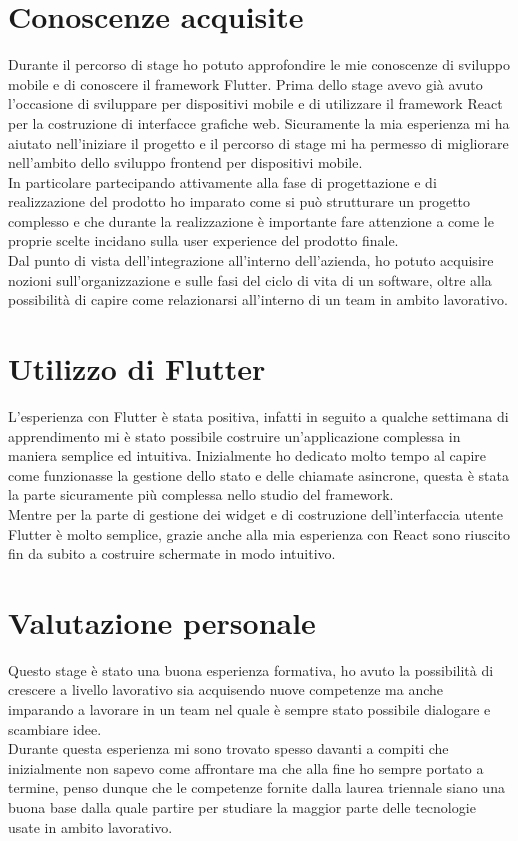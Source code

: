 \section{Conoscenze acquisite}
Durante il percorso di stage ho potuto approfondire le mie conoscenze di sviluppo mobile e di conoscere il framework Flutter.
Prima dello stage avevo già avuto l'occasione di sviluppare per dispositivi mobile e di utilizzare il framework React per la costruzione di interfacce grafiche web. Sicuramente la mia esperienza mi ha aiutato nell'iniziare il progetto e il percorso di stage mi ha permesso di migliorare nell'ambito dello sviluppo frontend per dispositivi mobile.\\
In particolare partecipando attivamente alla fase di progettazione e di realizzazione del prodotto ho imparato come si può strutturare un progetto complesso e che durante la realizzazione è importante fare attenzione a come le proprie scelte incidano sulla user experience del prodotto finale.\\
Dal punto di vista dell’integrazione all’interno dell’azienda, ho potuto acquisire nozioni sull’organizzazione e sulle fasi del ciclo di vita di un software, oltre alla possibilità di capire come relazionarsi all’interno di un team in ambito lavorativo.
\section{Utilizzo di Flutter}
L'esperienza con Flutter è stata positiva, infatti in seguito a qualche settimana di apprendimento mi è stato possibile costruire un'applicazione complessa in maniera semplice ed intuitiva. Inizialmente ho dedicato molto tempo al capire come funzionasse la gestione dello stato e delle chiamate asincrone, questa è stata la parte sicuramente più complessa nello studio del framework.\\ Mentre per la parte di gestione dei widget e di costruzione dell'interfaccia utente Flutter è molto semplice, grazie anche alla mia esperienza con React sono riuscito fin da subito a costruire schermate in modo intuitivo.\\

\section{Valutazione personale}
Questo stage è stato una buona esperienza formativa, ho avuto la possibilità di crescere a livello lavorativo sia acquisendo nuove competenze ma anche imparando a lavorare in un team nel quale è sempre stato possibile dialogare e scambiare idee.\\
Durante questa esperienza mi sono trovato spesso davanti a compiti che inizialmente non sapevo come affrontare ma che alla fine ho sempre portato a termine, penso dunque che le competenze fornite dalla laurea triennale siano una buona base dalla quale partire per studiare la maggior parte delle tecnologie usate in ambito lavorativo.